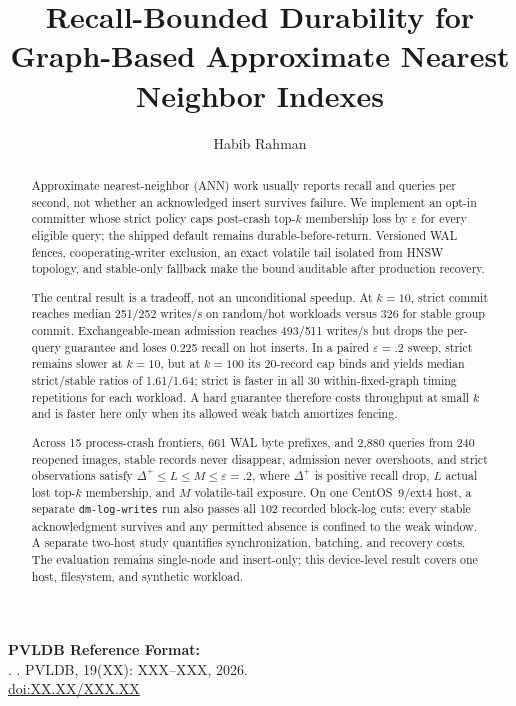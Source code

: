 \documentclass[sigconf,nonacm,balance=false]{acmart}
\title{Recall-Bounded Durability for Graph-Based Approximate Nearest Neighbor Indexes}
\author{Habib Rahman}
\affiliation{%
  \institution{Toronto Metropolitan University}
  \city{Toronto}
  \country{Canada}
}
\affiliation{%
  \institution{Meta}
  \city{Menlo Park}
  \state{California}
  \country{USA}
}
\newcommand\vldbdoi{XX.XX/XXX.XX}
\newcommand\vldbpages{XXX--XXX}
\newcommand\vldbvolume{19}
\newcommand\vldbissue{XX}
\newcommand\vldbyear{2026}
\newcommand\vldbauthors{\authors}
\newcommand\vldbtitle{\shorttitle}
\newcommand\vldbpagestyle{plain}
\begin{document}
\begin{abstract}
Approximate nearest-neighbor (ANN) work usually reports recall and queries per
second, not whether an acknowledged insert survives failure. We implement an
opt-in committer whose strict policy caps post-crash top-$k$ membership loss by
$\varepsilon$ for every eligible query; the shipped default remains
durable-before-return. Versioned WAL fences, cooperating-writer exclusion, an
exact volatile tail isolated from HNSW topology, and stable-only fallback make
the bound auditable after production recovery.

The central result is a tradeoff, not an unconditional speedup. At $k=10$, strict
commit reaches median 251/252 writes/s on random/hot workloads versus 326 for
stable group commit. Exchangeable-mean admission reaches 493/511 writes/s but drops
the per-query guarantee and loses 0.225 recall on hot inserts. In a paired
$\varepsilon=.2$ sweep, strict remains slower at $k=10$, but at $k=100$ its
20-record cap binds and yields median strict/stable ratios of 1.61/1.64; strict
is faster in all 30 within-fixed-graph timing repetitions for each workload. A
hard guarantee therefore costs throughput at small $k$ and is faster here only
when its allowed weak batch amortizes fencing.

Across 15 process-crash frontiers, 661 WAL byte prefixes, and 2{,}880 queries
from 240 reopened images, stable records never disappear, admission never
overshoots, and strict observations satisfy $\Delta^+\le L\le M\le
\varepsilon=.2$, where $\Delta^+$ is positive recall drop, $L$ actual lost
top-$k$ membership, and $M$ volatile-tail exposure. On one CentOS~9/ext4 host, a separate
\texttt{dm-log-writes} run also passes all 102 recorded block-log cuts: every
stable acknowledgment survives and any permitted absence is confined to the
weak window. A separate two-host study quantifies synchronization, batching,
and recovery costs. The evaluation remains single-node and insert-only; this
device-level result covers one host, filesystem, and synthetic workload.
\end{abstract}

\maketitle

\pagestyle{\vldbpagestyle}
\begingroup\small\noindent\raggedright\textbf{PVLDB Reference Format:}\\
\vldbauthors. \vldbtitle. PVLDB, \vldbvolume(\vldbissue): \vldbpages, \vldbyear.\\
\href{https://doi.org/\vldbdoi}{doi:\vldbdoi}
\endgroup
\end{document}
